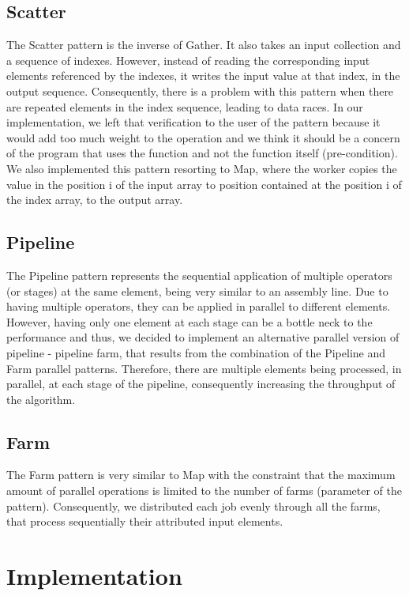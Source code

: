 \documentclass[conference,compsoc]{IEEEtran}
\begin{document}
\subsection{Scatter}

The Scatter pattern is the inverse of Gather. It also takes an input collection and a sequence of indexes. However, instead of reading the corresponding input elements referenced by the indexes, it writes the input value at that index, in the output sequence.
Consequently, there is a problem with this pattern when there are repeated elements in the index sequence, leading to data races.
In our implementation, we left that verification to the user of the pattern because it would add too much weight to the operation and we think it should be a concern of the program that uses the function and not the function itself (pre-condition).
We also implemented this pattern resorting to Map, where the worker copies the value in the position i of the input array to position contained at the position i of the index array, to the output array.

\subsection{Pipeline}
The Pipeline pattern represents the sequential application of multiple operators (or stages) at the same element, being very similar to an assembly line. Due to having multiple operators, they can be applied in parallel to different elements.
However, having only one element at each stage can be a bottle neck to the performance and thus, we decided to implement an alternative parallel version of pipeline - pipeline farm, that results from the combination of the Pipeline and Farm parallel patterns. Therefore, there are multiple elements being processed, in parallel, at each stage of the pipeline, consequently increasing the throughput of the algorithm.

\subsection{Farm}
The Farm pattern is very similar to Map with the constraint that the maximum amount of parallel operations is limited to the number of farms (parameter of the pattern). Consequently, we distributed each job evenly through all the farms, that process sequentially their attributed input elements.

\section{Implementation} \label{Implementation}
\end{document}
